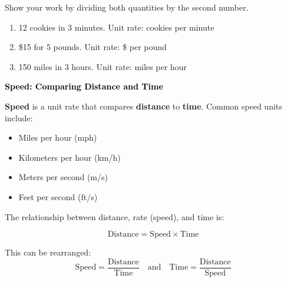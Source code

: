\documentclass[12pt, letterpaper, fleqn]{article}
\newcommand{\blankshorter}{\underline{\hspace{1.5cm}}}
\begin{document}
\noindent
Show your work by dividing both quantities by the second number.

\vspace{3mm}

\begin{enumerate}[itemsep=2cm, leftmargin=0.6cm]

\item 12 cookies in 3 minutes. Unit rate: \blankshorter \; cookies per minute

\item \$15 for 5 pounds. Unit rate: \$ \blankshorter \; per pound

\item 150 miles in 3 hours. Unit rate: \blankshorter \; miles per hour

\end{enumerate}

\newpage

\begin{tcolorbox}[colback=customteal!20]
\large\textcolor{black}{\textbf{Speed: Comparing Distance and Time}}
\end{tcolorbox}

\noindent
\textbf{Speed} is a unit rate that compares \textbf{distance} to \textbf{time}. Common speed units include:
\begin{itemize}
    \item Miles per hour (mph)
    \item Kilometers per hour (km/h)
    \item Meters per second (m/s)
    \item Feet per second (ft/s)
\end{itemize}

\medskip

\noindent
The relationship between distance, rate (speed), and time is:

$$\boxed{\text{Distance} = \text{Speed} \times \text{Time}}$$

\noindent
This can be rearranged:
$$\text{Speed} = \frac{\text{Distance}}{\text{Time}} \quad \text{and} \quad \text{Time} = \frac{\text{Distance}}{\text{Speed}}$$

\vspace{4mm}
\end{document}
